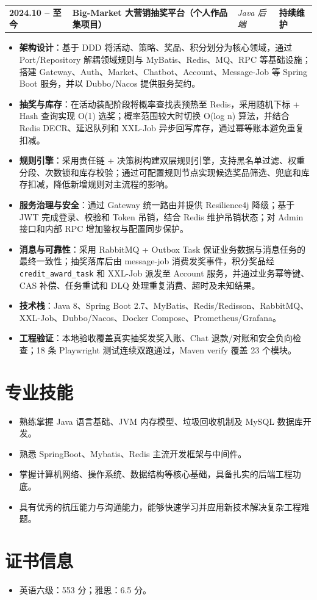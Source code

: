 \documentclass[10pt,a4paper]{article}
\makeatletter
\newcommand{\entry}[4]{%
  \noindent
  \begin{tabularx}{\textwidth}{@{}>{\bfseries}l >{\raggedright\arraybackslash}X >{\raggedright\arraybackslash}l >{\bfseries\raggedleft\arraybackslash}l@{}}
    #1 & \textbf{#2} & \textit{#3} & #4\\
  \end{tabularx}\par
}
\makeatother
\begin{document}
\vspace{0.15em}

\entry{2024.10 -- 至今}{Big-Market 大营销抽奖平台（个人作品集项目）}{Java 后端}{持续维护}
\begin{itemize}
  \item \textcolor{accent}{\textbf{架构设计}}：基于 DDD 将活动、策略、奖品、积分划分为核心领域，通过 Port/Repository 解耦领域规则与 MyBatis、Redis、MQ、RPC 等基础设施；搭建 Gateway、Auth、Market、Chatbot、Account、Message-Job 等 Spring Boot 服务，并以 Dubbo/Nacos 提供服务契约。
  \item \textcolor{accent}{\textbf{抽奖与库存}}：在活动装配阶段将概率查找表预热至 Redis，采用随机下标 + Hash 查询实现 O(1) 选奖；概率范围较大时切换 O(log n) 算法，并结合 Redis DECR、延迟队列和 XXL-Job 异步回写库存，通过幂等账本避免重复扣减。
  \item \textcolor{accent}{\textbf{规则引擎}}：采用责任链 + 决策树构建双层规则引擎，支持黑名单过滤、权重分段、次数锁和库存校验；通过可配置规则节点实现候选奖品筛选、兜底和库存扣减，降低新增规则对主流程的影响。
  \item \textcolor{accent}{\textbf{服务治理与安全}}：通过 Gateway 统一路由并提供 Resilience4j 降级；基于 JWT 完成登录、校验和 Token 吊销，结合 Redis 维护吊销状态；对 Admin 接口和内部 RPC 增加鉴权与配置同步保护。
  \item \textcolor{accent}{\textbf{消息与可靠性}}：采用 RabbitMQ + Outbox Task 保证业务数据与消息任务的最终一致性；抽奖落库后由 message-job 消费发奖事件，积分奖品经 \texttt{credit\_award\_task} 和 XXL-Job 派发至 Account 服务，并通过业务幂等键、CAS 补偿、任务重试和 DLQ 处理重复消费、超时及未知结果。
  \item \textcolor{accent}{\textbf{技术栈}}：Java 8、Spring Boot 2.7、MyBatis、Redis/Redisson、RabbitMQ、XXL-Job、Dubbo/Nacos、Docker Compose、Prometheus/Grafana。
  \item \textcolor{accent}{\textbf{工程验证}}：本地验收覆盖真实抽奖发奖入账、Chat 退款/对账和安全负向检查；18 条 Playwright 测试连续双跑通过，Maven verify 覆盖 23 个模块。
\end{itemize}

\section{专业技能}
\begin{itemize}
  \item 熟练掌握 Java 语言基础、JVM 内存模型、垃圾回收机制及 MySQL 数据库开发。
  \item 熟悉 SpringBoot、Mybatis、Redis 主流开发框架与中间件。
  \item 掌握计算机网络、操作系统、数据结构等核心基础，具备扎实的后端工程功底。
  \item 具有优秀的抗压能力与沟通能力，能够快速学习并应用新技术解决复杂工程难题。
\end{itemize}

\section{证书信息}
\begin{itemize}
  \item 英语六级：553 分；雅思：6.5 分。
\end{itemize}
\end{document}
